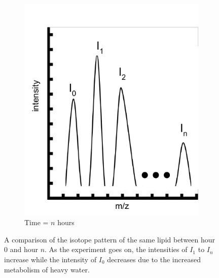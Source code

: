 \documentclass{l4proj}
\begin{document}
\begin{figure}
\begin{subfigure}{0.45\linewidth}
        \includegraphics[width=\linewidth]{dissertation/images/intensities_new_2.pdf}
    \caption{Time = $n$ hours}
    \end{subfigure}
    \caption{A comparison of the isotope pattern of the same lipid between hour 0 and hour $n$. As the experiment goes on, the intensities of $I_1$ to $I_n$ increase while the intensity of $I_0$ decreases due to the increased metabolism of heavy water.}
    \label{fig:intensities-comparison}
\end{figure}
\end{document}
